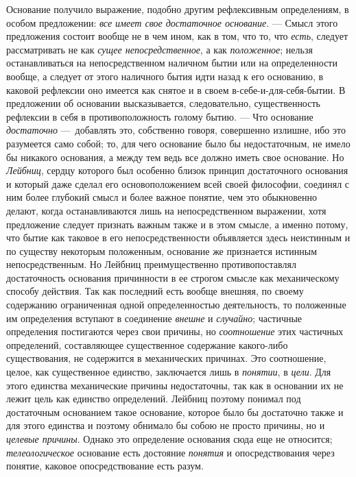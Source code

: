Основание получило выражение, подобно другим рефлексивным определениям, в
особом предложении: {\em все имеет свое достаточное
основание}. — Смысл этого предложения состоит вообще не в чем ином, как в
том, что то, что {\em есть}, следует рассматривать не
как {\em сущее непосредственное}, а как
{\em положенное}; нельзя останавливаться на
непосредственном наличном бытии или на определенности вообще, а следует от
этого наличного бытия идти назад к его основанию, в каковой рефлексии оно
имеется как снятое и в своем в-себе-и-для-себя-бытии. В предложении об
основании высказывается, следовательно, существенность рефлексии в себя в
противоположность голому бытию. — Что основание
{\em достаточно} —~добавлять это, собственно говоря,
совершенно излишне, ибо это разумеется само собой; то, для чего основание
было бы недостаточным, не имело бы никакого основания, а между тем ведь все
должно иметь свое основание. Но {\em Лейбниц}, сердцу
которого был особенно близок принцип достаточного основания и который даже
сделал его основоположением всей своей философии, соединял с ним более
глубокий смысл и более важное понятие, чем это обыкновенно делают, когда
останавливаются лишь на непосредственном выражении, хотя предложение
следует признать важным также и в этом смысле, а именно потому, что бытие
как таковое в его непосредственности объявляется здесь неистинным и по
существу некоторым положенным, основание же признается истинным
непосредственным. Но Лейбниц преимущественно противопоставлял достаточность
основания причинности в ее строгом смысле как механическому способу
действия. Так как последний есть вообще внешняя, по своему содержанию
ограниченная одной определенностью деятельность, то положенные им
определения вступают в соединение {\em внешне} и
{\em случайно}; частичные определения постигаются через
свои причины, но {\em соотношение} этих частичных
определений, составляющее существенное содержание какого-либо
существования, не содержится в механических причинах. Это соотношение,
целое, как существенное единство, заключается лишь в
{\em понятии}, в {\em цели}. Для
этого единства механические причины недостаточны, так как в основании их не
лежит цель как единство определений. Лейбниц поэтому понимал под
достаточным основанием такое основание, которое было бы достаточно также и
для этого единства и поэтому обнимало бы собою не просто причины, но и
{\em целевые причины}. Однако это определение основания
сюда еще не относится; {\em телеологическое} основание
есть достояние {\em понятия} и опосредствования через
понятие, каковое опосредствование есть разум.

